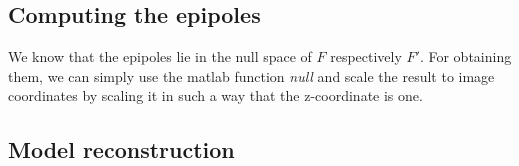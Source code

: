 \documentclass{paper}
\begin{document}
\subsection{Computing the epipoles}
We know that the epipoles lie in the null space of $F$ respectively $F'$. For
obtaining them, we can simply use the matlab function \emph{null} and scale 
the result to image coordinates by scaling it in such a way that 
the z-coordinate is one.
 
\subsection{Model reconstruction}


\end{document}
